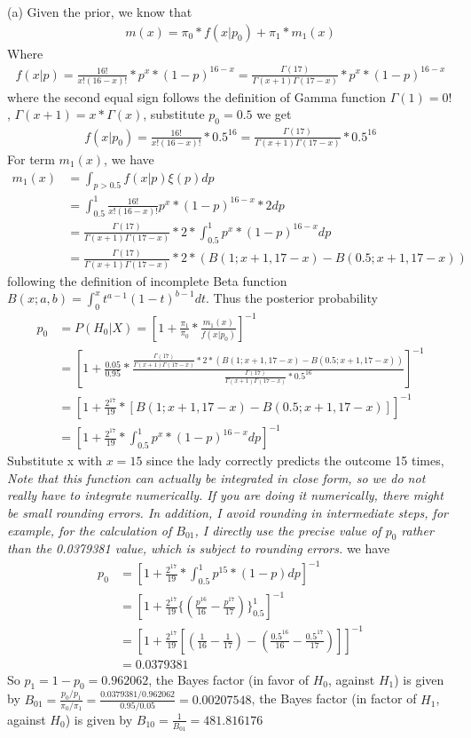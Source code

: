 \documentclass{homeworg}
\begin{document}
(a) Given the prior, we know that 
\begin{align*}
m(x)=\pi_0*f(x|p_0)+\pi_1*m_1(x)
\end{align*}
Where 
\begin{align*}
f(x|p)=\frac{16!}{x!(16-x)!}*p^x*(1-p)^{16-x}=\frac{\Gamma(17)}{\Gamma(x+1)\Gamma(17-x)}*p^x*(1-p)^{16-x}
\end{align*} 
where the second equal sign follows the definition of Gamma function $\Gamma(1)=0!$, $\Gamma(x+1)=x*\Gamma(x)$, substitute $p_0=0.5$ we get 
\begin{align*}
f(x|p_0)=\frac{16!}{x!(16-x)!}*0.5^{16}=\frac{\Gamma(17)}{\Gamma(x+1)\Gamma(17-x)}*0.5^{16}
\end{align*}
For term $m_1(x)$, we have
\begin{align*}
m_1(x)&=\int_{p>0.5}f(x|p)\xi (p) dp \\
&=\int_{0.5}^{1} \frac{16!}{x!(16-x)!} p^{x}*(1-p)^{16-x}*2dp\\
&=\frac{\Gamma(17)}{\Gamma(x+1)\Gamma(17-x)}*2*\int_{0.5}^{1}p^{x}*(1-p)^{16-x}dp\\
&=\frac{\Gamma(17)}{\Gamma(x+1)\Gamma(17-x)}*2*(B(1;x+1,17-x)-B(0.5;x+1,17-x))
\end{align*}
following the definition of incomplete Beta function $B(x;a,b)=\int_{0}^{x}t^{a-1}(1-t)^{b-1}dt$. Thus the posterior probability
\begin{align*}
p_0&=P(H_0|X)=[1+\frac{\pi_1}{\pi_0}*\frac{m_1(x)}{f(x|p_0)}]^{-1}\\
&=[1+\frac{0.05}{0.95}*\frac{\frac{\Gamma(17)}{\Gamma(x+1)\Gamma(17-x)}*2*(B(1;x+1,17-x)-B(0.5;x+1,17-x))}{\frac{\Gamma(17)}{\Gamma(x+1)\Gamma(17-x)}*0.5^{16}}]^{-1}\\
&=[1+\frac{2^{17}}{19}*[B(1;x+1,17-x)-B(0.5;x+1,17-x)]]^{-1}\\
&=[1+\frac{2^{17}}{19}*\int_{0.5}^{1}p^{x}*(1-p)^{16-x}dp]^{-1}
\end{align*}
Substitute x with $x=15$ since the lady correctly predicts the outcome 15 times, \emph{Note that this function can actually be integrated in close form, so we do not really have to integrate numerically. If you are doing it numerically, there might be small rounding errors. In addition, I avoid rounding in intermediate steps, for example, for the calculation of $B_{01}$, I directly use the precise value of $p_0$ rather than the 0.0379381 value, which is subject to rounding errors.} we have 
\begin{align*}
p_0&=[1+\frac{2^{17}}{19}*\int_{0.5}^{1}p^{15}*(1-p)dp]^{-1}\\
&=[1+\frac{2^{17}}{19}\{(\frac{p^{16}}{16}-\frac{p^{17}}{17})\}_{0.5}^1]^{-1}\\
&=[1+\frac{2^{17}}{19}[(\frac{1}{16}-\frac{1}{17})-(\frac{0.5^{16}}{16}-\frac{0.5^{17}}{17})]]^{-1}\\
&=0.0379381
\end{align*}
So $p_1=1-p_0=0.962062$, the Bayes factor (in favor of $H_0$, against $H_1$) is given by $B_{01}=\frac{p_0/p_1}{\pi_0/\pi_1}=\frac{0.0379381/0.962062}{0.95/0.05}=0.00207548$, the Bayes factor (in factor of $H_1$, against $H_0$) is given by $B_{10}=\frac{1}{B_{01}}=481.816176$
\end{document}

